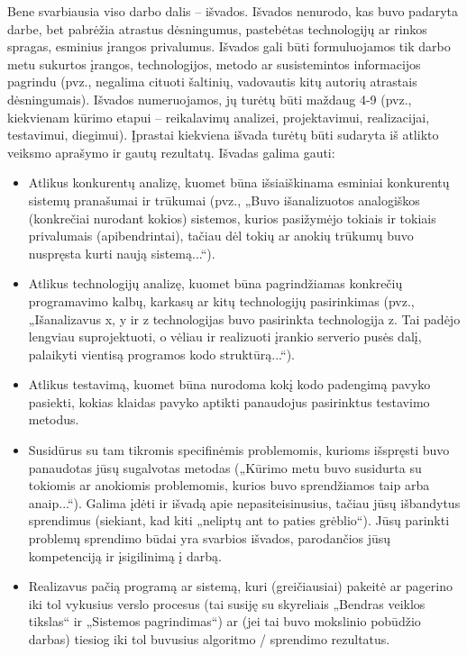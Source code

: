 \documentclass{ktuthesis}
\begin{document}
  Bene svarbiausia viso darbo dalis – išvados. Išvados nenurodo, kas buvo padaryta darbe, bet pabrėžia atrastus dėsningumus, pastebėtas technologijų
  ar rinkos spragas, esminius įrangos privalumus. Išvados gali būti formuluojamos tik darbo metu sukurtos įrangos, technologijos, metodo ar susistemintos
  informacijos pagrindu (pvz., negalima cituoti šaltinių, vadovautis kitų autorių atrastais dėsningumais).
  Išvados numeruojamos, jų turėtų būti maždaug 4-9 (pvz., kiekvienam kūrimo etapui – reikalavimų analizei, projektavimui, realizacijai, testavimui, diegimui).
  Įprastai kiekviena išvada turėtų būti sudaryta iš atlikto veiksmo aprašymo ir gautų rezultatų. Išvadas galima gauti:
  \begin{itemize}[label={--}]
    \item Atlikus konkurentų analizę, kuomet būna išsiaiškinama esminiai konkurentų sistemų pranašumai ir trūkumai (pvz., „Buvo išanalizuotos analogiškos
    (konkrečiai nurodant kokios) sistemos, kurios pasižymėjo tokiais ir tokiais privalumais (apibendrintai), tačiau dėl tokių ar anokių trūkumų buvo
    nuspręsta kurti naują sistemą...“).
    \item Atlikus technologijų analizę, kuomet būna pagrindžiamas konkrečių programavimo kalbų, karkasų ar kitų technologijų pasirinkimas
    (pvz., „Išanalizavus x, y ir z technologijas buvo pasirinkta technologija z. Tai padėjo lengviau suprojektuoti, o vėliau ir realizuoti įrankio serverio
    pusės dalį, palaikyti vientisą programos kodo struktūrą...“).
    \item Atlikus testavimą, kuomet būna nurodoma kokį kodo padengimą pavyko pasiekti, kokias klaidas pavyko aptikti panaudojus pasirinktus testavimo metodus.
    \item Susidūrus su tam tikromis specifinėmis problemomis, kurioms išspręsti buvo panaudotas jūsų sugalvotas metodas („Kūrimo metu buvo susidurta su tokiomis
    ar anokiomis problemomis, kurios buvo sprendžiamos taip arba anaip...“). Galima įdėti ir išvadą apie nepasiteisinusius, tačiau jūsų išbandytus sprendimus
    (siekiant, kad kiti „neliptų ant to paties grėblio“). Jūsų parinkti problemų sprendimo būdai yra svarbios išvados, parodančios jūsų kompetenciją ir įsigilinimą į darbą.
    \item Realizavus pačią programą ar sistemą, kuri (greičiausiai) pakeitė ar pagerino iki tol vykusius verslo procesus (tai susiję su skyreliais „Bendras veiklos tikslas“
     ir „Sistemos pagrindimas“) ar (jei tai buvo mokslinio pobūdžio darbas) tiesiog iki tol buvusius algoritmo / sprendimo rezultatus.
  \end{itemize}
\end{document}

